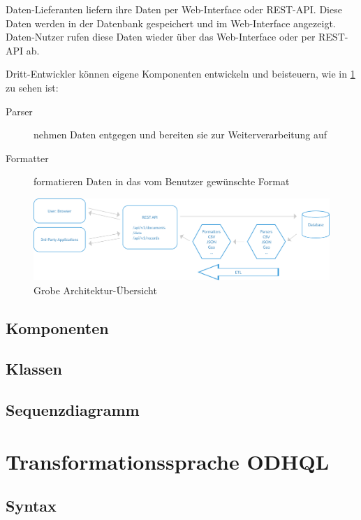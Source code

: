 Daten-Lieferanten liefern ihre Daten per Web-Interface oder REST-API. Diese Daten werden in der Datenbank gespeichert und im Web-Interface angezeigt. Daten-Nutzer rufen diese Daten wieder über das Web-Interface oder per REST-API ab. 

Dritt-Entwickler können eigene Komponenten entwickeln und beisteuern, wie in \cref{fig:pd:arch-overview} zu sehen ist:
\begin{description}
\item[Parser] nehmen Daten entgegen und bereiten sie zur Weiterverarbeitung auf
\item[Formatter] formatieren Daten in das vom Benutzer gewünschte Format
\end{description}

\begin{figure}[H]
    \centering
    \includegraphics[width=\linewidth]{fig/ODH-Architecture-Overview}
    \caption{Grobe Architektur-Übersicht}
    \label{fig:pd:arch-overview}
\end{figure}

\subsection{Komponenten}


\subsection{Klassen}


\subsection{Sequenzdiagramm}


\section{Transformationssprache ODHQL}

\subsection{Syntax}

